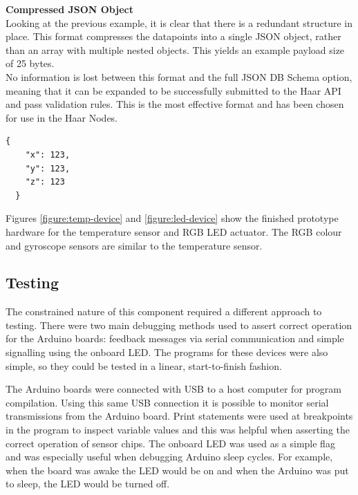       \noindent
      \begin{minipage}[t]{0.45\textwidth}
        \textbf{Compressed JSON Object}\\
        Looking at the previous example, it is clear that there is a redundant structure in place. This format compresses the datapoints into a single JSON object, rather than an array with multiple nested objects. This yields an example payload size of 25 bytes.\\

        No information is lost between this format and the full JSON DB Schema option, meaning that it can be expanded to be successfully submitted to the Haar API and pass validation rules. This is the most effective format and has been chosen for use in the Haar Nodes. 
      \end{minipage}
      \hfill
      \begin{minipage}[t]{0.45\textwidth}
        \begin{lstlisting}[frame=single, upquote=true]
  {
    "x": 123,
    "y": 123,
    "z": 123
  }
        \end{lstlisting}
      \end{minipage}

      \vspace{7.5mm}

      Figures \ref{figure:temp-device} and \ref{figure:led-device} show the finished prototype hardware for the temperature sensor and RGB LED actuator. The RGB colour and gyroscope sensors are similar to the temperature sensor. 

    \subsection{Testing}
      The constrained nature of this component required a different approach to testing. There were two main debugging methods used to assert correct operation for the Arduino boards: feedback messages via serial communication and simple signalling using the onboard LED. The programs for these devices were also simple, so they could be tested in a linear, start-to-finish fashion.

      The Arduino boards were connected with USB to a host computer for program compilation. Using this same USB connection it is possible to monitor serial transmissions from the Arduino board. Print statements were used at breakpoints in the program to inspect variable values and this was helpful when asserting the correct operation of sensor chips. The onboard LED was used as a simple flag and was especially useful when debugging Arduino sleep cycles. For example, when the board was awake the LED would be on and when the Arduino was put to sleep, the LED would be turned off.

